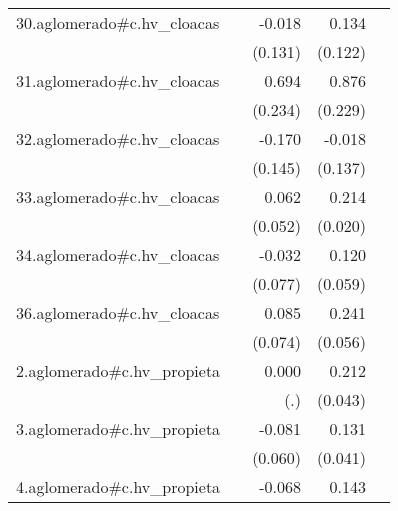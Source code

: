 {\begin{longtable}{l*{4}{D{.}{.}{-1}}}
\addlinespace
30.aglomerado#c.hv\_cloacas&                     &      -0.018         &       0.134         &                     \\
            &                     &     (0.131)         &     (0.122)         &                     \\
\addlinespace
31.aglomerado#c.hv\_cloacas&                     &       0.694\sym{**} &       0.876\sym{***}&                     \\
            &                     &     (0.234)         &     (0.229)         &                     \\
\addlinespace
32.aglomerado#c.hv\_cloacas&                     &      -0.170         &      -0.018         &                     \\
            &                     &     (0.145)         &     (0.137)         &                     \\
\addlinespace
33.aglomerado#c.hv\_cloacas&                     &       0.062         &       0.214\sym{***}&                     \\
            &                     &     (0.052)         &     (0.020)         &                     \\
\addlinespace
34.aglomerado#c.hv\_cloacas&                     &      -0.032         &       0.120\sym{*}  &                     \\
            &                     &     (0.077)         &     (0.059)         &                     \\
\addlinespace
36.aglomerado#c.hv\_cloacas&                     &       0.085         &       0.241\sym{***}&                     \\
            &                     &     (0.074)         &     (0.056)         &                     \\
\addlinespace
2.aglomerado#c.hv\_propieta&                     &       0.000         &       0.212\sym{***}&                     \\
            &                     &         (.)         &     (0.043)         &                     \\
\addlinespace
3.aglomerado#c.hv\_propieta&                     &      -0.081         &       0.131\sym{**} &                     \\
            &                     &     (0.060)         &     (0.041)         &                     \\
\addlinespace
4.aglomerado#c.hv\_propieta&                     &      -0.068         &       0.143\sym{***}&                     \\

\end{longtable}}
